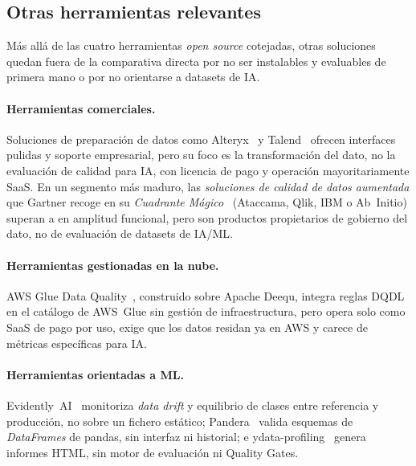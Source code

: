 \begingroup

\subsection{Otras herramientas relevantes}
\label{sec:herramientas-comerciales}

Más allá de las cuatro herramientas \emph{open source} cotejadas, otras
soluciones quedan fuera de la comparativa directa por no ser instalables y
evaluables de primera mano o por no orientarse a datasets de \ac{IA}.

\paragraph{Herramientas comerciales.}
Soluciones de preparación de datos como Alteryx~\citep{alteryx} y
Talend~\citep{talend} ofrecen interfaces pulidas y soporte empresarial, pero su
foco es la transformación del dato, no la evaluación de calidad para
\ac{IA}, con licencia de pago y operación mayoritariamente \ac{SaaS}. En un segmento más maduro, las \emph{soluciones de
calidad de datos aumentada} que Gartner recoge en su \emph{Cuadrante
Mágico}~\citep{gartner2025adq} (Ataccama, Qlik, IBM o Ab~Initio) superan a
\dataqual en amplitud funcional, pero son productos propietarios de gobierno
del dato, no de evaluación de datasets de \ac{IA}/\ac{ML}.

\paragraph{Herramientas gestionadas en la nube.}
\ac{AWS} Glue Data Quality~\citep{awsgluedq}, construido sobre Apache Deequ,
integra reglas DQDL en el catálogo de \ac{AWS}~Glue sin gestión de
infraestructura, pero opera solo como \ac{SaaS} de pago por uso, exige que los
datos residan ya en \ac{AWS} y carece de métricas específicas para \ac{IA}.

\paragraph{Herramientas orientadas a \ac{ML}.}
Evidently~AI~\citep{evidentlyai} monitoriza \emph{data drift} y equilibrio de
clases entre referencia y producción, no sobre un fichero estático; Pandera~\citep{pandera} valida esquemas de \emph{DataFrames}
de pandas, sin interfaz ni historial; e ydata-profiling~\citep{ydataprofiling}
genera informes HTML, sin motor de evaluación ni Quality Gates.
\endgroup


